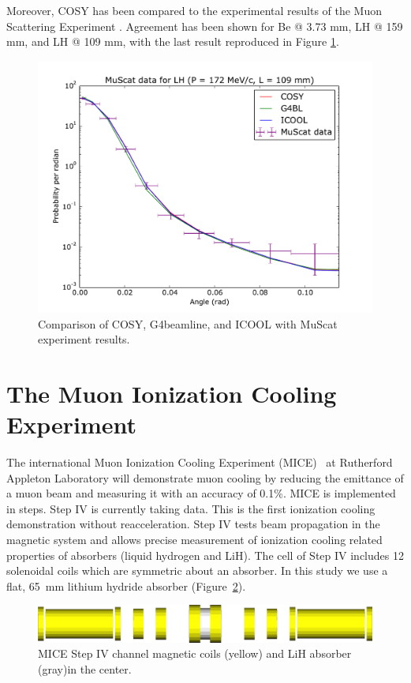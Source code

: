 \documentclass{jacow}
\begin{document}
Moreover, COSY has been compared to the experimental results of the Muon Scattering Experiment \cite{muscat}. Agreement has been shown for Be @ 3.73 mm, LH @ 159 mm, and LH @ 109 mm, with the last result reproduced in Figure \ref{fig:muscat}.

\begin{figure}[!ht]
\centering
\includegraphics[width=0.9\columnwidth]{172.109.muscat.pdf}
\caption{Comparison of COSY, G4beamline, and ICOOL with MuScat experiment results.}
\label{fig:muscat}
\end{figure}

\section{The Muon Ionization Cooling Experiment}
The international Muon Ionization Cooling Experiment (MICE)~\cite{mice} at Rutherford Appleton Laboratory will demonstrate muon cooling by reducing the emittance of a muon beam and measuring it with an accuracy of 0.1\%. MICE is implemented in steps. Step IV is currently taking data. This is the first ionization cooling demonstration without reacceleration. Step IV tests beam propagation in the magnetic system and allows precise measurement of ionization cooling related properties of absorbers (liquid hydrogen and LiH). The cell of Step IV includes 12 solenoidal coils which are symmetric about an absorber. In this study we use a flat, 65~mm lithium hydride absorber (Figure~\ref{fig:mice_channel}).
%
\begin{figure}[!ht]
\centering
\includegraphics*[width=\columnwidth]{mice_channel.png}
\caption{MICE Step IV channel magnetic coils (yellow) and LiH absorber (gray)in the center.}
\label{fig:mice_channel}
\end{figure}
\end{document}
